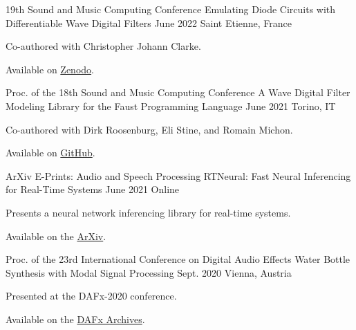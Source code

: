 \begin{cventries}
  \cventry
    {19th Sound and Music Computing Conference} %
    {Emulating Diode Circuits with Differentiable Wave Digital Filters} %
    {June 2022} %
    {Saint Etienne, France} %
    {
      \begin{cvitems} %
        \item {Co-authored with Christopher Johann Clarke.}
        \item {Available on \href{https://zenodo.org/record/6566846}{Zenodo}.}
      \end{cvitems}
    }


  \cventry
    {Proc. of the 18th Sound and Music Computing Conference} %
    {A Wave Digital Filter Modeling Library for the Faust Programming Language} %
    {June 2021} %
    {Torino, IT} %
    {
      \begin{cvitems} %
        \item {Co-authored with Dirk Roosenburg, Eli Stine, and Romain Michon.}
        \item {Available on \href{https://github.com/droosenb/faust-wdf-library/blob/main/SMC-2021-paper/a-wave-digital-filter-modeling-library-for-faust.pdf}{GitHub}.}
      \end{cvitems}
    }

  \cventry
    {ArXiv E-Prints: Audio and Speech Processing} %
    {RTNeural: Fast Neural Inferencing for Real-Time Systems} %
    {June 2021} %
    {Online} %
    {
      \begin{cvitems} %
        \item {Presents a neural network inferencing library for real-time systems.}
        \item {Available on the \href{https://arxiv.org/pdf/2106.03037.pdf}{ArXiv}.}
      \end{cvitems}
    }

  \cventry
    {Proc. of the 23rd International Conference on Digital Audio Effects} %
    {Water Bottle Synthesis with Modal Signal Processing} %
    {Sept. 2020} %
    {Vienna, Austria} %
    {
      \begin{cvitems} %
        \item {Presented at the DAFx-2020 conference.}
        \item {Available on the \href{https://www.dafx.de/paper-archive/2020/proceedings/papers/DAFx2020_paper_24.pdf}{DAFx Archives}.}
      \end{cvitems}
    }


\end{cventries}

